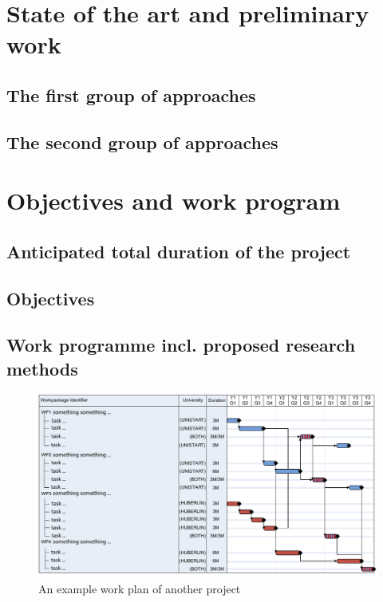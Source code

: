 \documentclass[11pt]{article}
\begin{document}
\section{State of the art and preliminary work}

\subsection{The first group of approaches} 
\subsection{The second group of approaches} \label{subsec_SecondGroupRelated}

\section{Objectives and work program}

\subsection{Anticipated total duration of the project}

\subsection{Objectives}

\newcommand{\WPone}{Something, something and doing something}
\newcommand{\WPtwo}{Working in a coal mine}
\newcommand{\WPthree}{Sixteen tons}
\newcommand{\WPfour}{Celebration preparation}

\subsection{Work programme incl. proposed research methods}
\label{subsec-workprogram}

\begin{figure}[ht]
\centering
\includegraphics[width=\linewidth]{img/gantt}
\caption{An example work plan of another project}
\label{fig:work-plan}
\end{figure}
\end{document}
